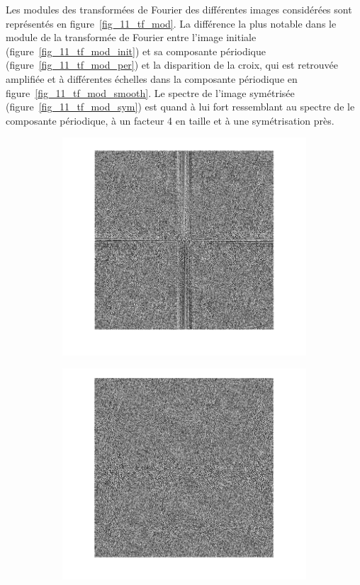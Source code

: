 \documentclass[12pt,a4paper,onecolumn]{article}
\begin{document}
Les modules des transformées de Fourier des différentes images considérées sont représentés en figure~\ref{fig_11_tf_mod}. La différence la plus notable dans le module de la transformée de Fourier entre l'image initiale (figure~\ref{fig_11_tf_mod_init}) et sa composante périodique (figure~\ref{fig_11_tf_mod_per}) et la disparition de la croix, qui est retrouvée amplifiée et à différentes échelles dans la composante périodique en figure~\ref{fig_11_tf_mod_smooth}. Le spectre de l'image symétrisée (figure~\ref{fig_11_tf_mod_sym}) est quand à lui fort ressemblant au spectre de le composante périodique, à un facteur 4 en taille et à une symétrisation près.

\begin{figure}[H]
	\centering
	\begin{subfigure}[b]{\textwidth}
		\centering
		\includegraphics[height = 0.25\textheight]{tf_ph_init}
		\label{fig_11_tf_ph_init}
	\end{subfigure}
	\begin{subfigure}[b]{0.4\textwidth}
		\centering
		\includegraphics[height = 0.25\textheight]{tf_ph_per}

\end{subfigure}
\end{figure}
\end{document}
